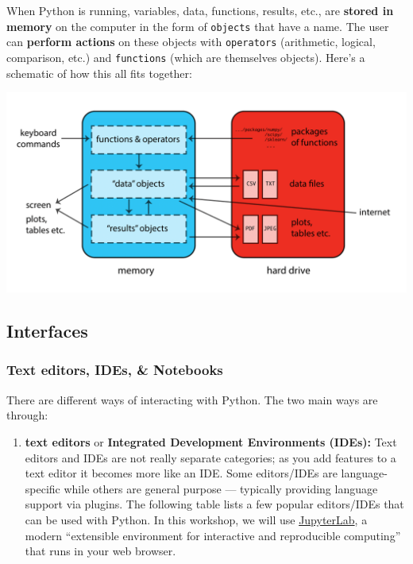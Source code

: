 \documentclass[
]{book}
\providecommand{\tightlist}{%
  \setlength{\itemsep}{0pt}\setlength{\parskip}{0pt}}
\begin{document}
When Python is running, variables, data, functions, results, etc., are \textbf{stored in memory}
on the computer in the form of \texttt{objects} that have a name. The user can
\textbf{perform actions} on these objects with \texttt{operators} (arithmetic, logical,
comparison, etc.) and \texttt{functions} (which are themselves objects). Here's a
schematic of how this all fits together:

\includegraphics{Python/PythonIntro/images/python_works.png}

\hypertarget{interfaces-1}{%
\subsection{Interfaces}\label{interfaces-1}}

\hypertarget{text-editors-ides-notebooks-1}{%
\subsubsection{Text editors, IDEs, \& Notebooks}\label{text-editors-ides-notebooks-1}}

There are different ways of interacting with Python. The two main ways are through:

\begin{enumerate}
\def\labelenumi{\arabic{enumi}.}
\tightlist
\item
  \textbf{text editors} or \textbf{Integrated Development Environments (IDEs):} Text editors and IDEs are not really separate categories; as you add features to a text editor it becomes more like an IDE. Some editors/IDEs are language-specific while others are general purpose --- typically providing language support via plugins. The following table lists a few popular editors/IDEs that can be used with Python. In this workshop, we will use \href{https://jupyter.org/}{JupyterLab}, a modern ``extensible environment for interactive and reproducible computing'' that runs in your web browser.
\end{enumerate}
\end{document}
